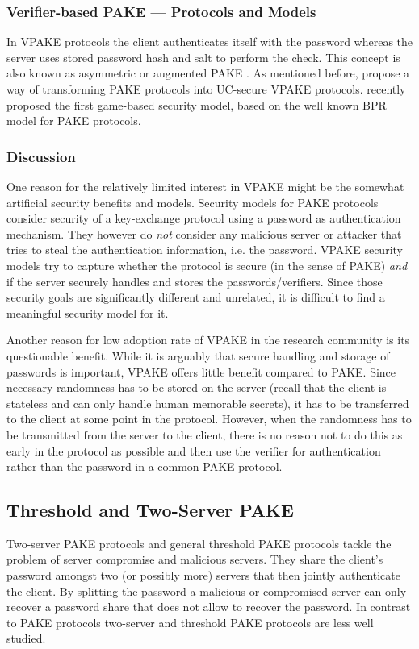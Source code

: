 \subsubsection{Verifier-based PAKE --- Protocols and Models}
In \ac{VPAKE} protocols the client authenticates itself with the password whereas the server uses stored password hash and salt to perform the check.
This concept is also known as asymmetric \cite{Bellare2000} or augmented \ac{PAKE} \cite{BellovinM93}.
As mentioned before, \citet{Gentry2006} propose a way of transforming \ac{PAKE} protocols into \ac{UC}-secure \ac{VPAKE} protocols.
\citet{BenhamoudaP13} recently proposed the first game-based security model, based on the well known BPR model for \ac{PAKE} protocols.

\subsubsection{Discussion}\label{sec:intro:vpake-discusion}
One reason for the relatively limited interest in \acl{VPAKE} might be the somewhat artificial security benefits and models.
Security models for \ac{PAKE} protocols consider security of a key-exchange protocol using a password as authentication mechanism.
They however do \emph{not} consider any malicious server or attacker that tries to steal the authentication information, i.e. the password.
\ac{VPAKE} security models try to capture whether the protocol is secure (in the sense of \acl{PAKE}) \emph{and} if the server securely handles and stores the passwords/verifiers.
Since those security goals are significantly different and unrelated, it is difficult to find a meaningful security model for it.

Another reason for low adoption rate of \ac{VPAKE} in the research community is its questionable benefit.
While it is arguably that secure handling and storage of passwords is important, \ac{VPAKE} offers little benefit compared to \ac{PAKE}.
Since necessary randomness has to be stored on the server (recall that the client is stateless and can only handle human memorable secrets), it has to be transferred to the client at some point in the protocol.
However, when the randomness has to be transmitted from the server to the client, there is no reason not to do this as early in the protocol as possible and then use the verifier for authentication rather than the password in a common \ac{PAKE} protocol.


\subsection{Threshold and Two-Server PAKE}
Two-server PAKE protocols \cite{Abdalla2005} and general threshold \ac{PAKE} protocols \cite{MacKenzieSJ02,RaimondoG03,Abdalla2005b} tackle the problem of server compromise and malicious servers.
They share the client's password amongst two (or possibly more) servers that then jointly authenticate the client.
By splitting the password a malicious or compromised server can only recover a password share that does not allow to recover the password.
In contrast to \ac{PAKE} protocols two-server and threshold \ac{PAKE} protocols are less well studied.

